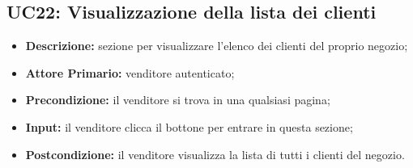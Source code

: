 \subsection{UC22: Visualizzazione della lista dei clienti}
\label{sec:UC22}
\begin{itemize}
    \item \textbf{Descrizione:} sezione per visualizzare l'elenco dei clienti del proprio negozio;
    \item \textbf{Attore Primario:} venditore autenticato;
    \item \textbf{Precondizione:} il venditore si trova in una qualsiasi pagina;
    \item \textbf{Input:} il venditore clicca il bottone per entrare in questa sezione;
    \item \textbf{Postcondizione:} il venditore visualizza la lista di tutti i clienti del negozio.
\end{itemize}